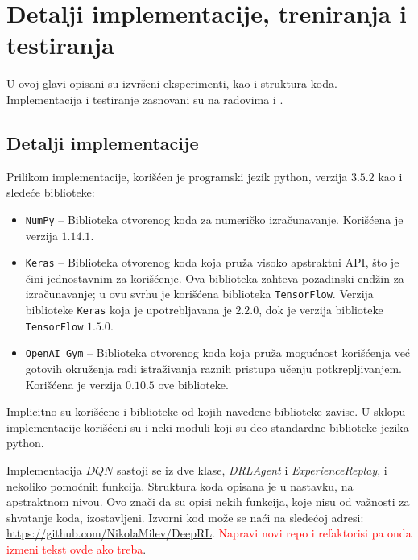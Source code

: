 \chapter{Detalji implementacije, treniranja i testiranja}
\label{ch:implementacija}

U ovoj glavi opisani su izvršeni eksperimenti, kao i struktura koda. Implementacija i testiranje zasnovani su na radovima \cite{dqn_mnih} i \cite{dqn_dm}.
\section{Detalji implementacije}
\label{sec:implementacija}
Prilikom implementacije, korišćen je programski jezik python\cite{python}, verzija $3.5.2$ kao i sledeće biblioteke:
\begin{itemize}
	\item \texttt{NumPy}\cite{numpy} -- Biblioteka otvorenog koda za numeričko izračunavanje. Korišćena je verzija $1.14.1$.
	\item \texttt{Keras}\cite{keras} -- Biblioteka otvorenog koda koja pruža visoko apstraktni API, što je čini jednostavnim za korišćenje. Ova biblioteka zahteva pozadinski endžin za izračunavanje; u ovu svrhu je korišćena biblioteka \texttt{TensorFlow}\cite{tensorflow}. Verzija biblioteke \texttt{Keras} koja je upotrebljavana je $2.2.0$, dok je verzija biblioteke \texttt{TensorFlow} $1.5.0$.
	\item  \texttt{OpenAI~Gym}\cite{openai_gym} -- Biblioteka otvorenog koda koja pruža mogućnost korišćenja već gotovih okruženja radi istraživanja raznih pristupa učenju potkrepljivanjem. Korišćena je verzija $0.10.5$ ove biblioteke.
\end{itemize}
Implicitno su korišćene i biblioteke od kojih navedene biblioteke zavise. U sklopu implementacije korišćeni su i neki moduli koji su deo standardne biblioteke jezika python.
\par 
Implementacija $DQN$ sastoji se iz dve klase, {\em DRLAgent} i {\em ExperienceReplay}, i nekoliko pomoćnih funkcija. Struktura koda opisana je u nastavku, na apstraktnom nivou. Ovo znači da su opisi nekih funkcija, koje nisu od važnosti za shvatanje koda, izostavljeni. Izvorni kod može se naći na sledećoj adresi: \url{https://github.com/NikolaMilev/DeepRL}. \textcolor{red}{Napravi novi repo i refaktorisi pa onda izmeni tekst ovde ako treba}.
